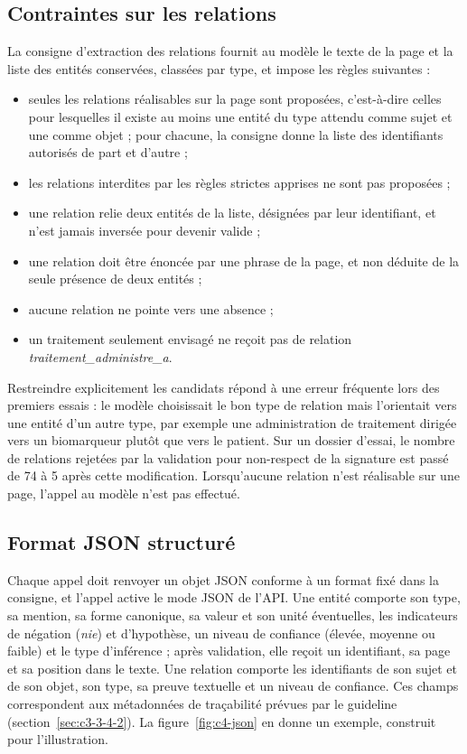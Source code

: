 \subsection{Contraintes sur les relations}\label{sec:c4-contraintes-relations}

La consigne d'extraction des relations fournit au modèle le texte de la page et la liste des entités conservées, classées par type, et impose les règles suivantes :
\begin{itemize}
  \item seules les relations réalisables sur la page sont proposées, c'est-à-dire celles pour lesquelles il existe au moins une entité du type attendu comme sujet et une comme objet ; pour chacune, la consigne donne la liste des identifiants autorisés de part et d'autre ;
  \item les relations interdites par les règles strictes apprises ne sont pas proposées ;
  \item une relation relie deux entités de la liste, désignées par leur identifiant, et n'est jamais inversée pour devenir valide ;
  \item une relation doit être énoncée par une phrase de la page, et non déduite de la seule présence de deux entités ;
  \item aucune relation ne pointe vers une absence ;
  \item un traitement seulement envisagé ne reçoit pas de relation \emph{traitement\_administre\_a}.
\end{itemize}
Restreindre explicitement les candidats répond à une erreur fréquente lors des premiers essais : le modèle choisissait le bon type de relation mais l'orientait vers une entité d'un autre type, par exemple une administration de traitement dirigée vers un biomarqueur plutôt que vers le patient. Sur un dossier d'essai, le nombre de relations rejetées par la validation pour non-respect de la signature est passé de 74 à 5 après cette modification. Lorsqu'aucune relation n'est réalisable sur une page, l'appel au modèle n'est pas effectué.

\subsection{Format JSON structuré}\label{sec:c4-json}

Chaque appel doit renvoyer un objet JSON conforme à un format fixé dans la consigne, et l'appel active le mode JSON de l'API. Une entité comporte son type, sa mention, sa forme canonique, sa valeur et son unité éventuelles, les indicateurs de négation (\emph{nie}) et d'hypothèse, un niveau de confiance (élevée, moyenne ou faible) et le type d'inférence ; après validation, elle reçoit un identifiant, sa page et sa position dans le texte. Une relation comporte les identifiants de son sujet et de son objet, son type, sa preuve textuelle et un niveau de confiance. Ces champs correspondent aux métadonnées de traçabilité prévues par le guideline (section~\ref{sec:c3-3-4-2}). La figure~\ref{fig:c4-json} en donne un exemple, construit pour l'illustration.

